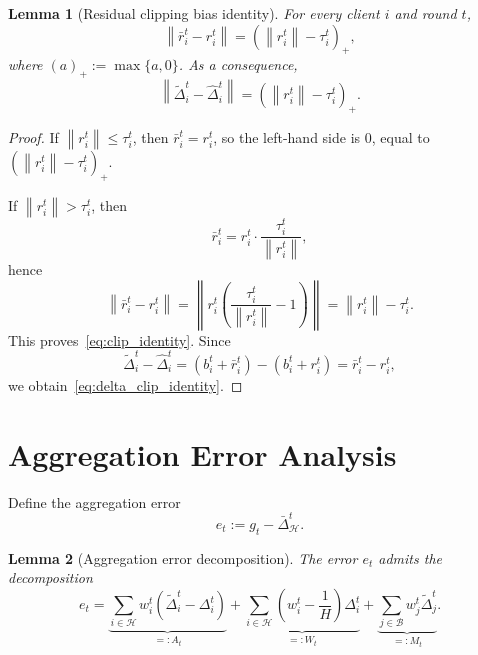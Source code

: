 \documentclass[11pt,a4paper]{article}
\newtheorem{lemma}{Lemma}
\theoremstyle{remark}
\newcommand{\HH}{\mathcal{H}}
\newcommand{\BB}{\mathcal{B}}
\newcommand{\norm}[1]{\left\lVert #1 \right\rVert}
\begin{document}
\begin{lemma}[Residual clipping bias identity]
\label{lem:clip_identity}
For every client \(i\) and round \(t\),
\begin{equation}
    \norm{\bar{r}_i^t - r_i^t}
    =
    (\norm{r_i^t} - \tau_i^t)_+,
    \label{eq:clip_identity}
\end{equation}
where \((a)_+ := \max\{a,0\}\).
As a consequence,
\begin{equation}
    \norm{\tilde{\Delta}_i^t - \hat{\Delta}_i^t}
    =
    (\norm{r_i^t} - \tau_i^t)_+.
    \label{eq:delta_clip_identity}
\end{equation}
\end{lemma}

\begin{proof}
If \(\norm{r_i^t} \le \tau_i^t\), then \(\bar{r}_i^t = r_i^t\), so the
left-hand side is \(0\), equal to
\((\norm{r_i^t}-\tau_i^t)_+\).

If \(\norm{r_i^t} > \tau_i^t\), then
\[
    \bar{r}_i^t = r_i^t \cdot \frac{\tau_i^t}{\norm{r_i^t}},
\]
hence
\[
    \norm{\bar{r}_i^t - r_i^t}
    =
    \left\|
        r_i^t\left(\frac{\tau_i^t}{\norm{r_i^t}} - 1\right)
    \right\|
    =
    \norm{r_i^t} - \tau_i^t.
\]
This proves~\eqref{eq:clip_identity}.
Since
\[
    \tilde{\Delta}_i^t - \hat{\Delta}_i^t
    =
    (b_i^t+\bar{r}_i^t) - (b_i^t+r_i^t)
    =
    \bar{r}_i^t-r_i^t,
\]
we obtain~\eqref{eq:delta_clip_identity}.
\end{proof}

\section{Aggregation Error Analysis}

Define the aggregation error
\begin{equation}
    e_t := g_t - \bar{\Delta}_{\HH}^t.
    \label{eq:e_t}
\end{equation}

\begin{lemma}[Aggregation error decomposition]
\label{lem:decomp}
The error \(e_t\) admits the decomposition
\begin{equation}
    e_t
    =
    \underbrace{
    \sum_{i \in \HH} w_i^t(\tilde{\Delta}_i^t - \Delta_i^t)
    }_{=:A_t}
    +
    \underbrace{
    \sum_{i \in \HH}
    \left(w_i^t - \frac{1}{H}\right)\Delta_i^t
    }_{=:W_t}
    +
    \underbrace{
    \sum_{j \in \BB} w_j^t \tilde{\Delta}_j^t
    }_{=:M_t}.
    \label{eq:decomposition}
\end{equation}
\end{lemma}
\end{document}
